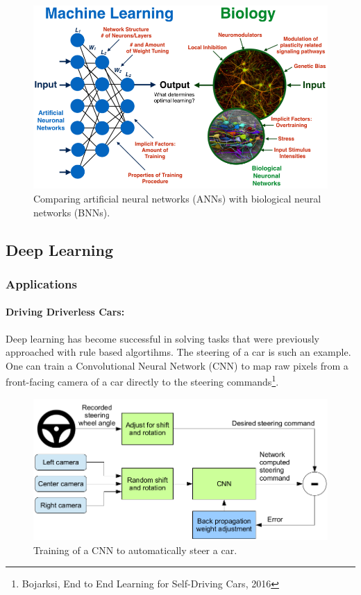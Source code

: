 \documentclass[main]{subfiles}
\begin{document}
\begin{figure}[h]
    \centering
    \includegraphics[width=0.8\linewidth]{01_Introduction/figures/MLvsBIO.png}
    \caption{Comparing artificial neural networks (ANNs) with biological neural networks (BNNs).}
    \label{fig:MLvsBIO}
\end{figure}
%

\subsection{Deep Learning}

\subsubsection{Applications}
\paragraph{Driving Driverless Cars:} 
Deep learning has become successful in solving tasks that were previously approached with rule based algortihms. The steering of a car is such an example. One can train a Convolutional Neural Network (CNN) to map raw pixels from a front-facing camera of a car directly to the steering commands\footnote{Bojarksi, End to End Learning for Self-Driving Cars, 2016}.
\begin{figure}[h]
    \centering
    \includegraphics[width=0.6\linewidth]{01_Introduction/figures/driverless.png}
    \caption{Training of a CNN to automatically steer a car.}
    \label{fig:my_label}
\end{figure}
\end{document}

